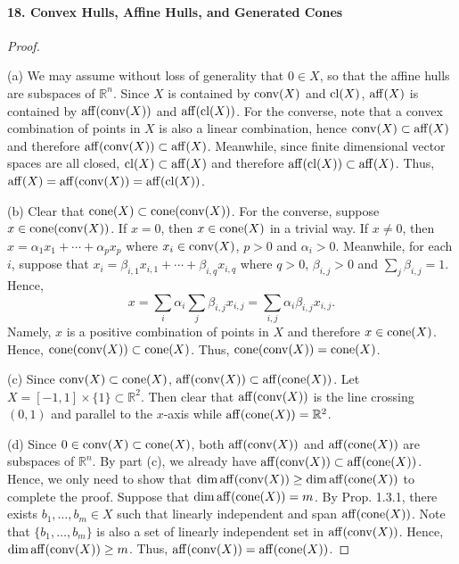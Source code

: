   \paragraph{18. Convex Hulls, Affine Hulls, and Generated Cones}
  \begin{proof}
    $\,$\par
    (a) We may assume without loss of generality that $0\in X$, so that the
    affine hulls are subspaces of $\mathbb{R}^n$. Since $X$ is contained by 
    $\operatorname{conv}(X)$ and $\operatorname{cl}(X)$, $\operatorname{aff}(X)$ is  contained by $\operatorname{aff}(\operatorname{conv}(X))$ and 
    $\operatorname{aff}(\operatorname{cl}(X))$. For the converse, note that a convex combination of points
    in $X$ is also a linear combination, hence $\operatorname{conv}(X)\subset\operatorname{aff}(X)$ and 
    therefore $\operatorname{aff}(\operatorname{conv}(X))\subset\operatorname{aff}(X)$. Meanwhile, since finite 
    dimensional vector spaces are all closed, $\operatorname{cl}(X)\subset\operatorname{aff}(X)$ and 
    therefore $\operatorname{aff}(\operatorname{cl}(X))\subset\operatorname{aff}(X)$. Thus, $\operatorname{aff}(X)=\operatorname{aff}(\operatorname{conv}(X))=\operatorname{aff}
    (\operatorname{cl}(X))$.\par
    (b) Clear that $\operatorname{cone}(X)\subset\operatorname{cone}(\operatorname{conv}(X))$. For the converse, suppose
    $x\in\operatorname{cone}(\operatorname{conv}(X))$. If $x=0$, then $x\in\operatorname{cone}(X)$ in a trivial way. If 
    $x\ne 0$, then $x=\alpha_1x_1+\cdots+\alpha_px_p$ where $x_i\in\operatorname{conv}(X)$, 
    $p>0$ and $\alpha_i>0$. Meanwhile, for each $i$, suppose that $x_i=
    \beta_{i,1}x_{i,1}+\cdots+\beta_{i,q}x_{i,q}$ where $q>0$, $\beta_{i,j}>0$ 
    and $\sum_j\beta_{i,j}=1$. Hence,
    \[
      x=\sum_i\alpha_i\sum_j\beta_{i,j}x_{i,j}=
      \sum_{i,j}\alpha_i\beta_{i,j}x_{i,j}.
    \]
    Namely, $x$ is a positive combination of points in $X$ and therefore $x\in
    \operatorname{cone}(X)$. Hence, $\operatorname{cone}(\operatorname{conv}(X))\subset\operatorname{cone}(X)$. Thus, $\operatorname{cone}(\operatorname{conv}(X))
    =\operatorname{cone}(X)$.\par
    (c) Since $\operatorname{conv}(X)\subset\operatorname{cone}(X)$, $\operatorname{aff}(\operatorname{conv}(X))\subset\operatorname{aff}(\operatorname{cone}(X))$.
    Let $X=[-1,1]\times\{1\}\subset\mathbb{R}^2$. Then clear that $\operatorname{aff}(
    \operatorname{conv}(X))$ is the line crossing $(0,1)$ and parallel to the $x$-axis while
    $\operatorname{aff}(\operatorname{cone}(X))=\mathbb{R}^2$.\par
    (d) Since $0\in\operatorname{conv}(X)\subset\operatorname{cone}(X)$, both $\operatorname{aff}(\operatorname{conv}(X))$ and $\operatorname{aff}
    (\operatorname{cone}(X))$ are subspaces of $\mathbb{R}^n$. By part (c), we already have
    $\operatorname{aff}(\operatorname{conv}(X))\subset\operatorname{aff}(\operatorname{cone}(X))$. Hence, we only need to show that 
    $\dim\operatorname{aff}(\operatorname{conv}(X))\ge\dim\operatorname{aff}(\operatorname{cone}(X))$ to complete the proof. Suppose 
    that $\dim\operatorname{aff}(\operatorname{cone}(X))=m$. By Prop. 1.3.1, there exists $b_1,\dots,b_m
    \in X$ such that linearly independent and span $\operatorname{aff}(\operatorname{cone}(X))$. Note that
    $\{b_1,\dots,b_m\}$ is also a set of linearly independent set in $\operatorname{aff}(
    \operatorname{conv}(X))$. Hence, $\dim\operatorname{aff}(\operatorname{conv}(X))\ge m$. Thus, $\operatorname{aff}(\operatorname{conv}(X))=\operatorname{aff}
    (\operatorname{cone}(X))$.
  \end{proof}
  
